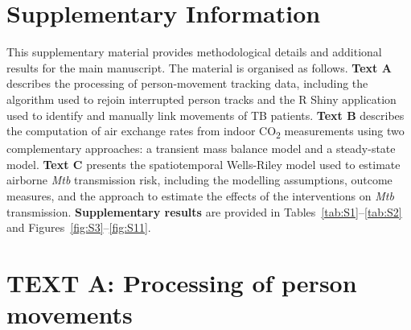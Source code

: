 \documentclass[11pt]{article}
\author{}
\date{}
\begin{document}
\renewcommand{\thefigure}{S\arabic{figure}}
\renewcommand{\thetable}{S\arabic{table}}

\section{Supplementary Information}\label{supplementary-information}

This supplementary material provides methodological details and additional results for the main manuscript. The material is organised as follows. \textbf{Text A} describes the processing of person-movement tracking data, including the algorithm used to rejoin interrupted person tracks and the R Shiny application used to identify and manually link movements of TB patients. \textbf{Text B} describes the computation of air exchange rates from indoor CO\textsubscript{2} measurements using two complementary approaches: a transient mass balance model and a steady-state model. \textbf{Text C} presents the spatiotemporal Wells-Riley model used to estimate airborne \emph{Mtb} transmission risk, including the modelling assumptions, outcome measures, and the approach to estimate the effects of the interventions on \emph{Mtb} transmission. \textbf{Supplementary results} are provided in Tables~\ref{tab:S1}--\ref{tab:S2} and Figures~\ref{fig:S3}--\ref{fig:S11}.

\section{TEXT A: Processing of person movements}\label{text-a}

\end{document}
